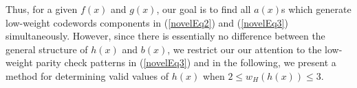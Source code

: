 
Thus, for a given $f(x)$ and $g(x)$, our goal is to find all $a(x)$s which generate low-weight codewords components in  (\ref{novelEq2}) and  (\ref{novelEq3}) simultaneously. 
However, since there is essentially no difference between the general structure of $h(x)$ and $b(x)$, we restrict our our attention to the low-weight parity check patterns in  (\ref{novelEq3}) and in the following, we present a method for determining valid values of $h(x)$ when $2 \leq w_H(h(x))\leq 3$. 


